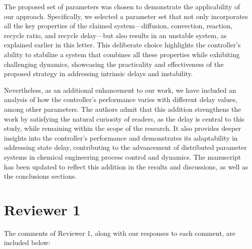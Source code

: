 \documentclass[12pt,answers]{exam}
\begin{document}
The proposed set of parameters was chosen to demonstrate the applicability of our approach. Specifically, we selected a parameter set that not only incorporates all the key properties of the claimed system—diffusion, convection, reaction, recycle ratio, and recycle delay—but also results in an unstable system, as explained earlier in this letter. This deliberate choice highlights the controller's ability to stabilize a system that combines all these properties while exhibiting challenging dynamics, showcasing the practicality and effectiveness of the proposed strategy in addressing intrinsic delays and instability.

Nevertheless, as an additional enhancement to our work, we have included an analysis of how the controller’s performance varies with different delay values, among other parameters. The authors admit that this addition strengthens the work by satisfying the natural curiosity of readers, as the delay is central to this study, while remaining within the scope of the research. It also provides deeper insights into the controller’s performance and demonstrates its adaptability in addressing state delay, contributing to the advancement of distributed parameter systems in chemical engineering process control and dynamics. The manuscript has been updated to reflect this addition in the results and discussions, as well as the conclusions sections.

\newpage

\section{Reviewer 1}

The comments of Reviewer 1, along with our responses to each comment, are included below:

\begin{quote}
\end{quote}
\end{document}
